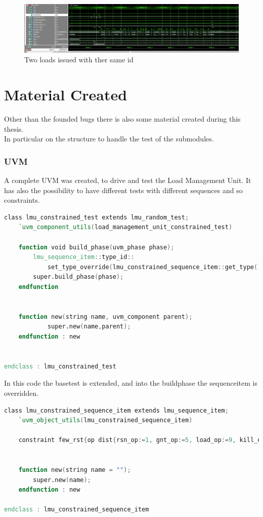 \begin{figure}[H]
    \centering
    \includegraphics[scale = 0.22]{Chapter_3/img/2-loads.png}
    \caption{Two loads issued with ther same id}
    \label{2-loads}
\end{figure}

\section{Material Created}
Other than the founded bugs there is also some material created during this thesis.\\
In particular on the structure to handle the test of the submodules.\\

\subsubsection{UVM}
A complete UVM was created, to drive and test the Load Management Unit. It has also the possibility to have different tests with different sequences and so constraints.\\
\begin{lstlisting}[language=Verilog,style=verilog-style, backgroundcolor=\color{lyel_palette}, frame=tlb]
class lmu_constrained_test extends lmu_random_test;
   	`uvm_component_utils(load_management_unit_constrained_test)

	function void build_phase(uvm_phase phase);
		lmu_sequence_item::type_id::
		    set_type_override(lmu_constrained_sequence_item::get_type());
		super.build_phase(phase);
	endfunction


	function new(string name, uvm_component parent);
      		super.new(name,parent);
   	endfunction : new


endclass : lmu_constrained_test
\end{lstlisting}

In this code the base\+test is extended, and into the build\+phase the sequence\+item is overridden.\\

\begin{lstlisting}[language=Verilog,style=verilog-style, backgroundcolor=\color{lyel_palette}, frame=tlb]
class lmu_constrained_sequence_item extends lmu_sequence_item;
	`uvm_object_utils(lmu_constrained_sequence_item)

	constraint few_rst{op dist{rsn_op:=1, gnt_op:=5, load_op:=9, kill_op:=2};}
	

	function new(string name = "");
		super.new(name);
	endfunction : new

endclass : lmu_constrained_sequence_item
\end{lstlisting}

